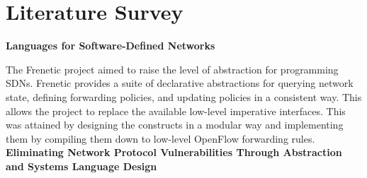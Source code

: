 
\section{Literature Survey}

\textbf{Languages for Software-Defined Networks} 

The Frenetic project aimed to raise the level of abstraction for 
programming SDNs. Frenetic provides a suite of declarative abstractions 
for querying network state, defining forwarding policies, and updating 
policies in a consistent way. This allows the project to replace the 
available low-level imperative interfaces. This was attained by designing 
the constructs in a modular way and implementing them by compiling
them down to low-level OpenFlow forwarding rules. \cite{Foster2013} \\

\noindent \textbf{Eliminating Network Protocol Vulnerabilities Through Abstraction and Systems Language Design
}



\cite{Casey2013}